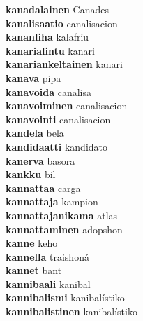 \textbf{kanadalainen } Canades \\
\textbf{kanalisaatio } canalisacion \\
\textbf{kananliha } kalafriu \\
\textbf{kanarialintu } kanari \\
\textbf{kanariankeltainen } kanari \\
\textbf{kanava } pipa \\
\textbf{kanavoida } canalisa \\
\textbf{kanavoiminen } canalisacion \\
\textbf{kanavointi } canalisacion \\
\textbf{kandela } bela \\
\textbf{kandidaatti } kandidato \\
\textbf{kanerva } basora \\
\textbf{kankku } bil \\
\textbf{kannattaa } carga \\
\textbf{kannattaja } kampion \\
\textbf{kannattajanikama } atlas \\
\textbf{kannattaminen } adopshon \\
\textbf{kanne } keho \\
\textbf{kannella } traishoná \\
\textbf{kannet } bant \\
\textbf{kannibaali } kanibal \\
\textbf{kannibalismi } kanibalístiko \\
\textbf{kannibalistinen } kanibalístiko \\
